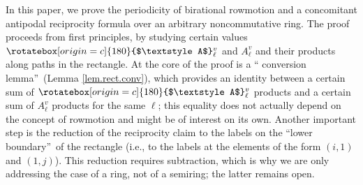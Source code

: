 \documentclass[numbers=enddot,12pt,final,onecolumn,notitlepage]{scrartcl}%
\theoremstyle{definition}
\newcommand{\upslack}{\mathchoice{\rotatebox[origin=c]{180}{$\displaystyle A$}}{\rotatebox[origin=c]{180}{$\textstyle A$}}{\rotatebox[origin=c]{180}{$\scriptstyle A$}}{\rotatebox[origin=c]{180}{$\scriptscriptstyle A$}}}
\newcommand{\downslack}{A}
\begin{document}
In this paper, we prove the periodicity of birational rowmotion and a
concomitant antipodal reciprocity formula over an arbitrary noncommutative
ring. The proof proceeds from first principles, by studying certain values
$\upslack_{\ell}^{v}$ and $\downslack_{\ell}^{v}$ and their products along
paths in the rectangle. At the core of the proof is a \textquotedblleft
conversion lemma\textquotedblright\ (Lemma \ref{lem.rect.conv}), which
provides an identity between a certain sum of $\upslack_{\ell}^{v}$ products
and a certain sum of $\downslack_{\ell}^{v}$ products for the same $\ell$;
this equality does not actually depend on the concept of rowmotion and might
be of interest on its own. Another important step is the reduction of the
reciprocity claim to the labels on the \textquotedblleft lower
boundary\textquotedblright\ of the rectangle (i.e., to the labels at the
elements of the form $\left(  i,1\right)  $ and $\left(  1,j\right)  $). This
reduction requires subtraction, which is why we are only addressing the case
of a ring, not of a semiring; the latter remains open.

\end{document}
